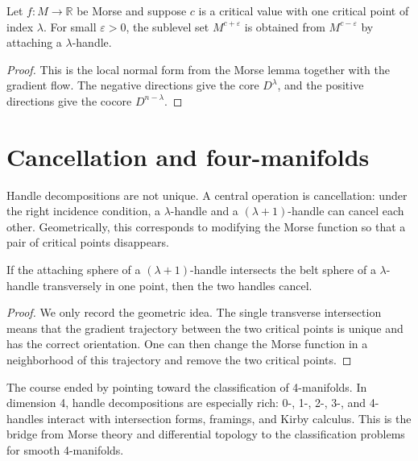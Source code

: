 \begin{theorem}
\label{theorem-handle-attachment}
Let $f:M\to\mathbb R$ be Morse and suppose
$c$ is a critical value with one critical
point of index $\lambda$.  For small
$\varepsilon>0$, the sublevel set
$M^{c+\varepsilon}$ is obtained from
$M^{c-\varepsilon}$ by attaching a
$\lambda$-handle.
\end{theorem}

\begin{proof}
This is the local normal form from the Morse
lemma together with the gradient flow.  The
negative directions give the core
$D^\lambda$, and the positive directions give
the cocore $D^{n-\lambda}$.
\end{proof}

\section{Cancellation and four-manifolds}
\label{section-cancellation-four-manifolds}

\noindent
Handle decompositions are not unique.  A
central operation is cancellation: under the
right incidence condition, a
$\lambda$-handle and a $(\lambda+1)$-handle
can cancel each other.  Geometrically, this
corresponds to modifying the Morse function
so that a pair of critical points disappears.

\begin{theorem}
\label{theorem-cancellation-principle}
If the attaching sphere of a
$(\lambda+1)$-handle intersects the belt
sphere of a $\lambda$-handle transversely in
one point, then the two handles cancel.
\end{theorem}

\begin{proof}
We only record the geometric idea.  The
single transverse intersection means that the
gradient trajectory between the two critical
points is unique and has the correct
orientation.  One can then change the Morse
function in a neighborhood of this trajectory
and remove the two critical points.
\end{proof}

\noindent
The course ended by pointing toward the
classification of 4-manifolds.  In dimension
4, handle decompositions are especially rich:
0-, 1-, 2-, 3-, and 4-handles interact with
intersection forms, framings, and Kirby
calculus.  This is the bridge from Morse
theory and differential topology to the
classification problems for smooth
4-manifolds.

